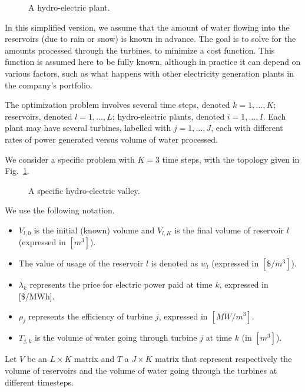 \documentclass[11pt]{article}
\begin{document}
\begin{figure}[h!]
\begin{center}
\caption{A hydro-electric plant.}
\end{center}
\end{figure}

In this simplified version, we assume that the amount of water flowing into the reservoirs (due to rain or snow) is known in advance. The goal is to solve for the amounts processed through the turbines, to minimize a cost function. This function is assumed here to be fully known, although in practice it can depend on various factors, such as what happens with other electricity generation plants in the company's portfolio.

The optimization problem involves several time steps, denoted $k=1,\ldots,K$; reservoirs, denoted  $l = 1, \ldots, L$; hydro-electric plants, denoted $i = 1, \ldots, I$. Each plant may have several turbines, labelled with $j=1,\ldots,J$, each with different rates of power generated versus volume of water processed.

We consider a specific problem with $K = 3$ time steps, with the topology given in Fig.~\ref{fig:lpqp_hydro_valley}.
\begin{figure}[ht]
\begin{center}
\caption{\label{fig:lpqp_hydro_valley} A specific hydro-electric valley.}
\end{center}
\end{figure}

We use the following notation.
\begin{itemize}
\item $V_{l,0}$ is the initial (known) volume and $V_{l,K}$ is the final volume of reservoir $l$ (expressed in $[m^3]$).
\item The value of usage of the reservoir $l$ is denoted as $w_l$ (expressed in $[\$/m^3]$).
\item $\lambda_k$ represents the price for electric power paid at time $k$, expressed in [\$/MWh].
\item $\rho_j$ represents the efficiency of turbine $j$, expressed in $[MW/m^3]$.
\item $T_{j,k}$ is the volume of water going through turbine $j$ at time $k$ (in $[m^3]$).
\end{itemize}
Let $V$ be an $L \times K$ matrix and $T$ a $J \times K$ matrix that represent respectively the volume of reservoirs and the volume of water going through the turbines at different timesteps.
\end{document}
